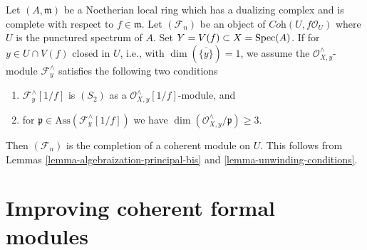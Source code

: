 \begin{remark}
\label{remark-interesting-case-bis}
Let $(A, \mathfrak m)$ be a Noetherian local ring which has a
dualizing complex and is complete with respect to $f \in \mathfrak m$.
Let $(\mathcal{F}_n)$ be an object of $\textit{Coh}(U, f\mathcal{O}_U)$
where $U$ is the punctured spectrum of $A$.
Set $Y = V(f) \subset X = \mathop{\mathrm{Spec}}(A)$.
If for $y \in U \cap V(f)$ closed in $U$, i.e., with
$\dim(\overline{\{y\}}) = 1$, we assume the
$\mathcal{O}_{X, y}^\wedge$-module $\mathcal{F}_y^\wedge$
satisfies the following two conditions
\begin{enumerate}
\item $\mathcal{F}_y^\wedge[1/f]$ is $(S_2)$ as a
$\mathcal{O}_{X, y}^\wedge[1/f]$-module, and
\item for $\mathfrak p \in \text{Ass}(\mathcal{F}_y^\wedge[1/f])$
we have $\dim(\mathcal{O}_{X, y}^\wedge/\mathfrak p) \geq 3$.
\end{enumerate}
Then $(\mathcal{F}_n)$ is the completion of a coherent module on $U$.
This follows from Lemmas \ref{lemma-algebraization-principal-bis}
and \ref{lemma-unwinding-conditions}.
\end{remark}
































\section{Improving coherent formal modules}
\label{section-improving-formal-modules}

